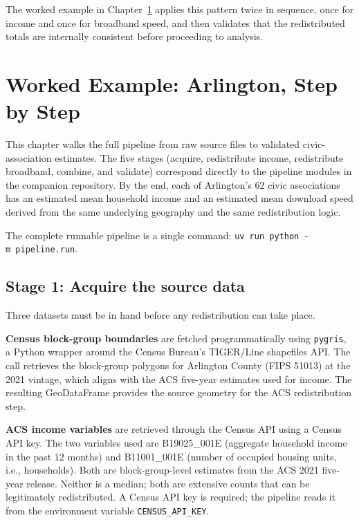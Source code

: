 \documentclass[
  letterpaper,
  DIV=11,
  numbers=noendperiod]{scrreprt}
\begin{document}
The worked example in Chapter~\ref{sec-example} applies this pattern
twice in sequence, once for income and once for broadband speed, and
then validates that the redistributed totals are internally consistent
before proceeding to analysis.


\chapter{Worked Example: Arlington, Step by Step}\label{sec-example}

This chapter walks the full pipeline from raw source files to validated
civic-association estimates. The five stages (acquire, redistribute
income, redistribute broadband, combine, and validate) correspond
directly to the pipeline modules in the companion repository. By the
end, each of Arlington's 62 civic associations has an estimated mean
household income and an estimated mean download speed derived from the
same underlying geography and the same redistribution logic.

The complete runnable pipeline is a single command:
\texttt{uv\ run\ python\ -m\ pipeline.run}.

\section{Stage 1: Acquire the source
data}\label{stage-1-acquire-the-source-data}

Three datasets must be in hand before any redistribution can take place.

\textbf{Census block-group boundaries} are fetched programmatically
using \texttt{pygris}, a Python wrapper around the Census Bureau's
TIGER/Line shapefiles API. The call retrieves the block-group polygons
for Arlington County (FIPS 51013) at the 2021 vintage, which aligns with
the ACS five-year estimates used for income. The resulting GeoDataFrame
provides the source geometry for the ACS redistribution step.

\textbf{ACS income variables} are retrieved through the Census API using
a Census API key. The two variables used are B19025\_001E (aggregate
household income in the past 12 months) and B11001\_001E (number of
occupied housing units, i.e., households). Both are block-group-level
estimates from the ACS 2021 five-year release. Neither is a median; both
are extensive counts that can be legitimately redistributed. A Census
API key is required; the pipeline reads it from the environment variable
\texttt{CENSUS\_API\_KEY}.
\end{document}
